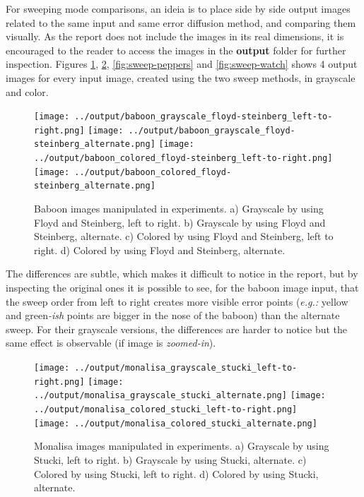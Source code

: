 \documentclass[]{IEEEtran}
\begin{document}
For sweeping mode comparisons, an ideia is to place side by side output images related to the same input and same error diffusion method, and comparing them visually. As the report does not include the images in its real dimensions, it is encouraged to the reader to access the images in the \textbf{output} folder for further inspection. Figures \ref{fig:sweep-baboon}, \ref{fig:sweep-monalisa}, \ref{fig:sweep-peppers} and \ref{fig:sweep-watch} shows 4 output images for every input image, created using the two sweep methods, in grayscale and color.

\begin{figure}[H]
  \centering
  \texttt{[image: ../output/baboon\_grayscale\_floyd-steinberg\_left-to-right.png]}
  \texttt{[image: ../output/baboon\_grayscale\_floyd-steinberg\_alternate.png]}
  \texttt{[image: ../output/baboon\_colored\_floyd-steinberg\_left-to-right.png]}
  \texttt{[image: ../output/baboon\_colored\_floyd-steinberg\_alternate.png]}
  \caption{Baboon images manipulated in experiments. a) Grayscale by using Floyd and Steinberg, left to right. b) Grayscale by using Floyd and Steinberg, alternate. c) Colored by using Floyd and Steinberg, left to right. d) Colored by using Floyd and Steinberg, alternate.}
  \label{fig:sweep-baboon}
\end{figure}

The differences are subtle, which makes it difficult to notice in the report, but by inspecting the original ones it is possible to see, for the baboon image input, that the sweep order from left to right creates more visible error points (\textit{e.g.: }yellow and green\textit{-ish} points are bigger in the nose of the baboon) than the alternate sweep. For their grayscale versions, the differences are harder to notice but the same effect is observable (if image is \textit{zoomed-in}).

\begin{figure}[H]
  \centering
  \texttt{[image: ../output/monalisa\_grayscale\_stucki\_left-to-right.png]}
  \texttt{[image: ../output/monalisa\_grayscale\_stucki\_alternate.png]}
  \texttt{[image: ../output/monalisa\_colored\_stucki\_left-to-right.png]}
  \texttt{[image: ../output/monalisa\_colored\_stucki\_alternate.png]}
  \caption{Monalisa images manipulated in experiments. a) Grayscale by using Stucki, left to right. b) Grayscale by using Stucki, alternate. c) Colored by using Stucki, left to right. d) Colored by using Stucki, alternate.}
  \label{fig:sweep-monalisa}
\end{figure}
\end{document}
